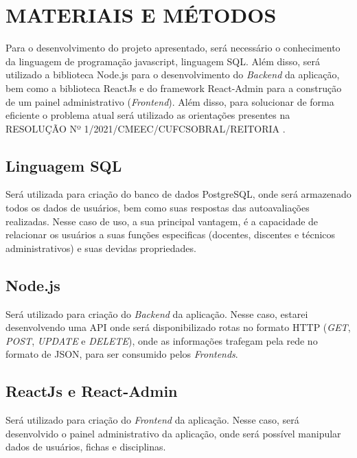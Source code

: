 \chapter{MATERIAIS E MÉTODOS}
\label{cap:materiais-e-metodos}
   Para o desenvolvimento do projeto apresentado, será necessário o conhecimento da linguagem de programação javascript, linguagem SQL. Além disso, será utilizado a biblioteca Node.js para o desenvolvimento do \textit{Backend} da aplicação, bem como a biblioteca ReactJs e do framework React-Admin para a construção de um painel administrativo (\textit{Frontend}). Além disso, para solucionar de forma eficiente o problema atual será utilizado as orientações presentes na RESOLUÇÃO Nº 1/2021/CMEEC/CUFCSOBRAL/REITORIA \cite{resolucao2021}.
    
    \section{Linguagem SQL}
    \label{sec:sql}

        Será utilizada para criação do banco de dados PostgreSQL, onde será armazenado todos os dados de usuários, bem como suas respostas das autoavaliações realizadas. Nesse caso de uso, a sua principal vantagem, é a capacidade de relacionar os usuários a suas funções especificas (docentes, discentes e técnicos administrativos) e suas devidas propriedades. 
    
    \section{Node.js}
    \label{sec:node.js}
        Será utilizado para criação do \textit{Backend} da aplicação. Nesse caso, estarei desenvolvendo uma \gls{API} onde será disponibilizado rotas no formato \gls{HTTP} (\textit{GET}, \textit{POST}, \textit{UPDATE} e \textit{DELETE}), onde as informações trafegam pela rede no formato de \gls{JSON}, para ser consumido pelos \textit{Frontends}.\nocite{docnode2021}
        
    \section{ReactJs e React-Admin}
    \label{sec:reactjs}
        Será utilizado para criação do \textit{Frontend} da aplicação. Nesse caso, será desenvolvido o painel administrativo da aplicação, onde será possível manipular dados de usuários, fichas e disciplinas.\nocite{docreact2021}\nocite{docreactadmin2021}

